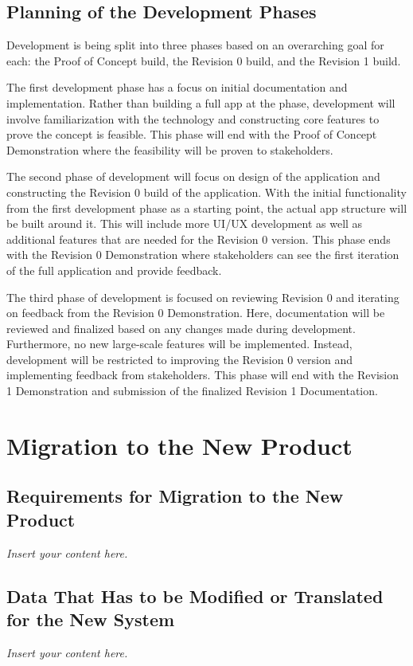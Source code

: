 \documentclass[12pt]{article}
\newcommand{\lips}{\textit{Insert your content here.}}
\begin{document}
\subsection{Planning of the Development Phases}

Development is being split into three phases based on an overarching goal for each: the Proof of Concept build,
the Revision 0 build, and the Revision 1 build. \par

The first development phase has a focus on initial documentation and implementation.
Rather than building a full app at the phase, development will involve familiarization with
the technology and constructing core features to prove the concept is feasible. This phase will
end with the Proof of Concept Demonstration where the feasibility will be proven to stakeholders. \par

The second phase of development will focus on design of the application and constructing the
Revision 0 build of the application. With the initial functionality from the first development phase as
a starting point, the actual app structure will be built around it. This will include more UI/UX
development as well as additional features that are needed for the Revision 0 version. This phase ends
with the Revision 0 Demonstration where stakeholders can see the first iteration of the full application
and provide feedback. \par

The third phase of development is focused on reviewing Revision 0 and iterating on feedback from the
Revision 0 Demonstration. Here, documentation will be reviewed and finalized based on any changes made
during development. Furthermore, no new large-scale features will be implemented. Instead, development
will be restricted to improving the Revision 0 version and implementing feedback from stakeholders. This phase
will end with the Revision 1 Demonstration and submission of the finalized Revision 1 Documentation.

\section{Migration to the New Product}
\subsection{Requirements for Migration to the New Product}
\lips
\subsection{Data That Has to be Modified or Translated for the New System}
\lips
\end{document}
